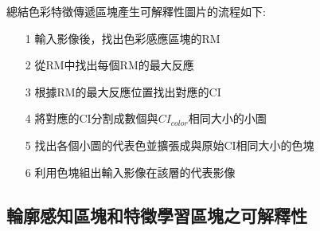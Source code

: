 \documentclass[class=NCU_thesis, crop=false]{standalone}
\begin{document}
	總結色彩特徵傳遞區塊產生可解釋性圖片的流程如下:
	\begin{itemize}
		\item [1]
		輸入影像後，找出色彩感應區塊的RM
		\item [2]
		從RM中找出每個RM的最大反應
		\item [3]
		根據RM的最大反應位置找出對應的CI
		\item [4]
		將對應的CI分割成數個與$CI_{color}$相同大小的小圖
		\item [5]
		找出各個小圖的代表色並擴張成與原始CI相同大小的色塊
		\item [6]
		利用色塊組出輸入影像在該層的代表影像
	\end{itemize}

	\subsection{輪廓感知區塊和特徵學習區塊之可解釋性}
	
\end{document}

